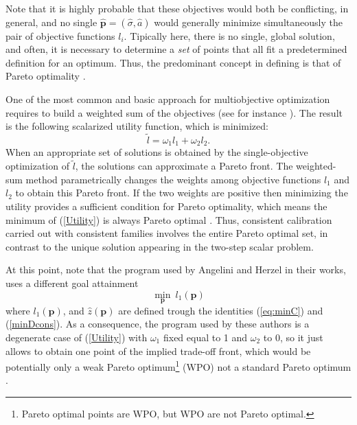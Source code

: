 
Note that it is highly probable that these objectives would both be
conflicting, in general, and no single $\boldsymbol{\hat p}=(\hat
\sigma,\hat a)$ would generally minimize simultaneously the pair of
objective functions $l_i$. Tipically here, there is no single, global
solution, and often, it is necessary to determine a {\sl set} of
points that all fit a predetermined definition for an optimum. Thus,
the predominant concept in defining is that of Pareto optimality
\cite{P:1906}.  

One of the most common and basic approach for multiobjective
optimization requires to build a weighted sum of the objectives (see
for instance \cite{EKO:1990,M:2005}). The result is the following
scalarized utility function, which is minimized: 
 \begin{equation}
\label{Utility}
\tilde l=\omega_1 l_1+\omega_2 l_2.
\end{equation} 
When an appropriate set of solutions is obtained by the
single-objective optimization of $\tilde l$, the solutions can
approximate a Pareto front. The weighted-sum method parametrically
changes the weights among objective functions $l_1$ and 
$l_2$ to obtain this Pareto front. If the two weights are positive
then minimizing the utility provides a sufficient condition for Pareto
optimality, which means the minimum of (\ref{Utility}) is always
Pareto optimal \cite[Sect. 4.1.1, pp. 41--42]{M:2005}. Thus,
consistent calibration carried out with consistent families involves
the entire Pareto optimal set, in contrast to the unique solution
appearing in the two-step scalar problem.

At this point, note that the program used by Angelini and Herzel
\cite{AH:2002,AH:2005} in their works, uses a different goal
attainment 
\begin{equation}
\label{eq:minConsAH}
\underset{\boldsymbol p}{\min}\: l_1(\boldsymbol p)
\end{equation}
where $l_1(\boldsymbol p)$, and $\hat{z}(\boldsymbol p)$ are
defined trough the identities (\ref{eq:minC}) and (\ref{minDcons}). As
a consequence, the program used by these authors is a degenerate case
of (\ref{Utility}) with $\omega_1$ fixed equal to 1 and
$\omega_2$ to 0, so it just allows to obtain one point of the implied
trade-off front, which would be potentially only a weak Pareto
optimum\footnote{Pareto optimal points are WPO, but WPO are not Pareto
optimal.} (WPO) not a standard Pareto optimum \cite[Sect. 4.1.1,
p. 42]{M:2005}. 

